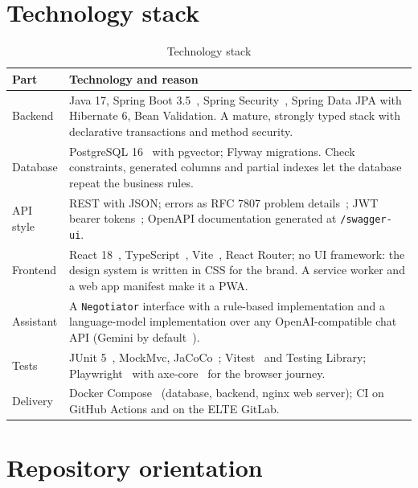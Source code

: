 \section{Technology stack}

\begin{table}[!htbp]
	\centering
	\begin{tabularx}{\textwidth}{l X}
		\toprule
		\textbf{Part} & \textbf{Technology and reason} \\
		\midrule
		Backend & Java 17, Spring Boot 3.5~\cite{springboot}, Spring Security~\cite{springsecurity}, Spring Data JPA with
		Hibernate 6, Bean Validation. A mature, strongly typed stack with declarative transactions and method security. \\
		Database & PostgreSQL 16~\cite{postgres} with pgvector; Flyway migrations. Check constraints, generated columns and
		partial indexes let the database repeat the business rules. \\
		API style & REST with JSON; errors as RFC 7807 problem details~\cite{rfc7807}; JWT bearer tokens~\cite{rfc7519};
		OpenAPI documentation generated at \texttt{/swagger-ui}. \\
		Frontend & React 18~\cite{react}, TypeScript~\cite{typescript}, Vite~\cite{vite}, React Router; no UI framework:
		the design system is written in CSS for the brand. A service worker and a web app manifest make it a PWA. \\
		Assistant & A \texttt{Negotiator} interface with a rule-based implementation and a language-model implementation
		over any OpenAI-compatible chat API (Gemini by default~\cite{gemini}). \\
		Tests & JUnit 5~\cite{junit}, MockMvc, JaCoCo~\cite{jacoco}; Vitest~\cite{vitest} and Testing Library;
		Playwright~\cite{playwright} with axe-core~\cite{axe} for the browser journey. \\
		Delivery & Docker Compose~\cite{docker} (database, backend, nginx web server); CI on GitHub Actions and on the ELTE
		GitLab. \\
		\bottomrule
	\end{tabularx}
	\caption{Technology stack}
	\label{tab:stack}
\end{table}

\section{Repository orientation}

